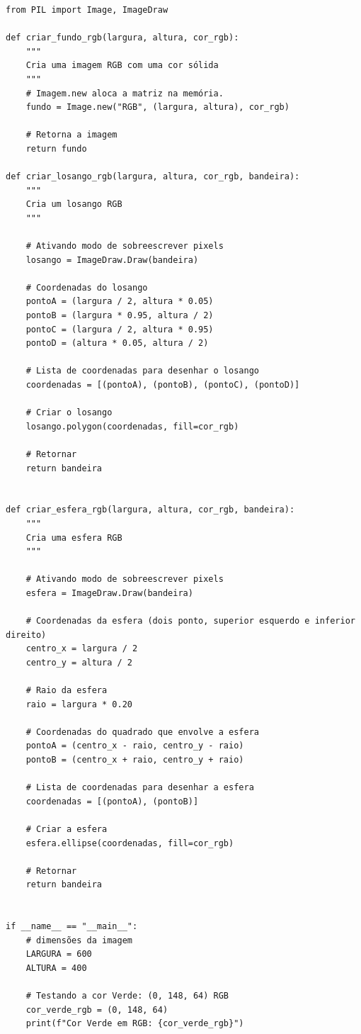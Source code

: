 \documentclass{article}
\begin{document}
\begin{lstlisting}[style=pythonstyle, caption={Código completo para renderização da bandeira brasileira}, label={lst:codigo_completo}]
from PIL import Image, ImageDraw

def criar_fundo_rgb(largura, altura, cor_rgb):
    """
    Cria uma imagem RGB com uma cor sólida
    """
    # Imagem.new aloca a matriz na memória.
    fundo = Image.new("RGB", (largura, altura), cor_rgb)

    # Retorna a imagem
    return fundo

def criar_losango_rgb(largura, altura, cor_rgb, bandeira):
    """
    Cria um losango RGB
    """

    # Ativando modo de sobreescrever pixels
    losango = ImageDraw.Draw(bandeira)

    # Coordenadas do losango
    pontoA = (largura / 2, altura * 0.05)
    pontoB = (largura * 0.95, altura / 2)
    pontoC = (largura / 2, altura * 0.95)
    pontoD = (altura * 0.05, altura / 2)

    # Lista de coordenadas para desenhar o losango
    coordenadas = [(pontoA), (pontoB), (pontoC), (pontoD)]

    # Criar o losango
    losango.polygon(coordenadas, fill=cor_rgb)

    # Retornar
    return bandeira


def criar_esfera_rgb(largura, altura, cor_rgb, bandeira):
    """
    Cria uma esfera RGB
    """

    # Ativando modo de sobreescrever pixels
    esfera = ImageDraw.Draw(bandeira)

    # Coordenadas da esfera (dois ponto, superior esquerdo e inferior direito)
    centro_x = largura / 2
    centro_y = altura / 2

    # Raio da esfera
    raio = largura * 0.20

    # Coordenadas do quadrado que envolve a esfera
    pontoA = (centro_x - raio, centro_y - raio)
    pontoB = (centro_x + raio, centro_y + raio)

    # Lista de coordenadas para desenhar a esfera
    coordenadas = [(pontoA), (pontoB)]

    # Criar a esfera
    esfera.ellipse(coordenadas, fill=cor_rgb)

    # Retornar
    return bandeira


if __name__ == "__main__":
    # dimensões da imagem
    LARGURA = 600
    ALTURA = 400

    # Testando a cor Verde: (0, 148, 64) RGB
    cor_verde_rgb = (0, 148, 64)
    print(f"Cor Verde em RGB: {cor_verde_rgb}")


\end{lstlisting}
\end{document}
